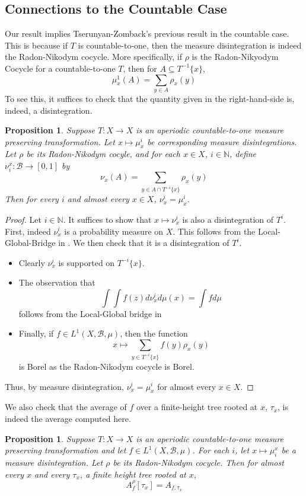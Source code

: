 \documentclass{article}
\newcommand{\N}{\mathbb{N}}
\newtheorem{proposition}[theorem]{Proposition}
\theoremstyle{definition}
\begin{document}
\subsection{Connections to the Countable Case}
\noindent Our result implies Tserunyan-Zomback's previous result in the countable case. This is because if $ T $ is countable-to-one, then the measure disintegration is indeed the Radon-Nikodym cocycle. More specifically, if $ \rho $ is the Radon-Nikyodym Cocycle for a countable-to-one $ T $, then for $ A\subseteq T^{-1}\{x\} $,
\[
\mu_x^1(A) = \sum_{y\in A} \rho_x(y)
\]
To see this, it suffices to check that the quantity given in the right-hand-side is, indeed, a disintegration.
\begin{proposition}
    Suppose $ T:X\rightarrow X $ is an aperiodic countable-to-one measure preserving transformation. Let $ x\mapsto \mu_x^i $ be corresponding measure disintegrations. Let $ \rho $ be its Radon-Nikodym cocyle, and for each $ x\in X $, $ i\in \N $, define $ \nu_i^x:\mathcal{B}\rightarrow [0,1] $ by
    \[
    \nu_x(A) = \sum_{y\in A\cap T^{-i}\{x\}} \rho_x(y)
    \]
    Then for every $ i $ and almost every $ x\in X $, $ \nu^i_x = \mu^i_x $.
\end{proposition}
\begin{proof}
    Let $ i\in \N $. It suffices to show that $ x\mapsto \nu^i_x $ is also a disintegration of $ T^i $. First, indeed $ \nu^i_x $ is a probability measure on $ X $. This follows from the Local-Global-Bridge in \cite{anushpaper}. We then check that it is a disintegration of $ T^i $.
    \begin{itemize}
        \item Clearly $ \nu^i_x $ is supported on $ T^{-i}\{x\} $.
        \item The observation that
        \[
        \int \int f(z)d\nu^i_x d\mu(x) = \int fd\mu
        \]
        follows from the Local-Global bridge in \cite{anushpaper}
        \item Finally, if $ f\in L^1(X,\mathcal{B},\mu) $, then the function
        \[
        x\mapsto \sum_{y\in T^{-i}\{x\}} f(y)\rho_x(y)
        \]
        is Borel as the Radon-Nikodym cocycle is Borel.
    \end{itemize}
    Thus, by measure disintegration, $ \nu^i_x = \mu^i_x $ for almost every $ x\in X $.
\end{proof}
\noindent We also check that the average of $ f $ over a finite-height tree rooted at $ x $, $ \tau_x $, is indeed the average computed here.
\begin{proposition}
    Suppose $ T:X\rightarrow X $ is an aperiodic countable-to-one measure preserving transformation and let $ f\in L^1(X,\mathcal{B},\mu) $. For each $ i $, let $ x\mapsto \mu^x_i $ be a measure disintegration. Let $ \rho $ be its Radon-Nikodym cocycle. Then for almost every $ x $ and every $ \tau_x $, a finite height tree rooted at $  x$, 
    \[
    A^\rho_f[\tau_x] = A_{f,\tau_x}
    \]
\end{proposition}
\end{document}
